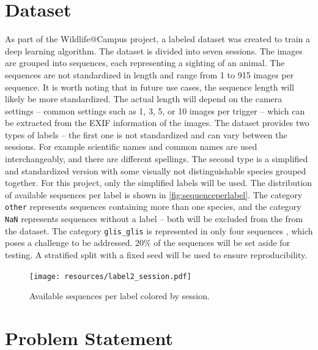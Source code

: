 \documentclass{article}
\begin{document}
\section*{Dataset} %

As part of the Wildlife@Campus project, a labeled dataset was created to train a deep learning algorithm.
The dataset is divided into seven sessions. The images are grouped into sequences, each representing a sighting
of an animal. The sequences are not standardized in length and range from 1 to 915 images per sequence.
It is worth noting that in future use cases, the sequence length will likely be more standardized.
The actual length will depend on the camera settings -- common settings such as 1, 3, 5, or 10 images per trigger --
which can be extracted from the EXIF information of the images. The dataset provides two types of labels --
the first one is not standardized and can vary between the sessions. For example scientific names and common names
are used interchangeably, and there are different spellings. The second type is a simplified and standardized version
with some visually not distinguishable species grouped together. For this project, only the simplified labels
will be used. The distribution of available sequences per label is shown in \autoref{fig:sequenceperlabel}.
The category \texttt{other} represents sequences containing more than one species, and the category \texttt{NaN}
represents sequences without a label -- both will be excluded from the from the dataset.
The category \texttt{glis\_glis} is represented in only four sequences
, which poses a challenge to be addressed.
20\% of the sequences will be set aside for testing. A stratified split with a fixed seed will be used to ensure
reproducibility.

\begin{figure}[ht]
  \centering
  \texttt{[image: resources/label2\_session.pdf]}
  \caption{Available sequences per label colored by session.}
  \label{fig:sequenceperlabel}
\end{figure}

\section*{Problem Statement} %

\end{document}

